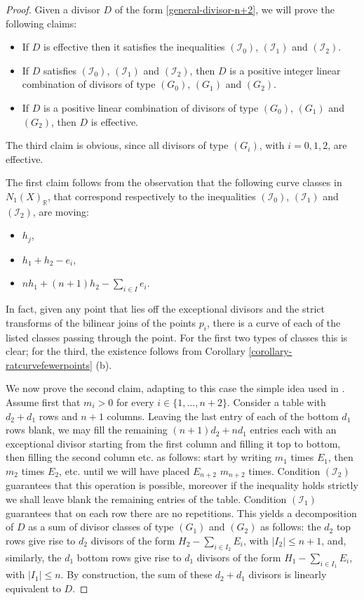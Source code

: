 \documentclass[a4paper,11pt]{article}
\begin{document}
\begin{proof}
Given a divisor $D$ of the form \eqref{general-divisor-n+2}, we will prove the following claims:
\begin{itemize}
\item If $D$ is effective then it satisfies the inequalities $(\mathcal I_0)$, $(\mathcal I_1)$ and $(\mathcal I_2)$.
\item If $D$ satisfies $(\mathcal{I}_0)$, $(\mathcal{I}_1)$ and $(\mathcal{I}_2)$, then $D$ is a positive integer linear combination of divisors of type $(G_0)$, $(G_1)$ and $(G_2)$.
\item If $D$ is a positive linear combination of divisors of type $(G_0)$, $(G_1)$ and $(G_2)$, then $D$ is effective.
\end{itemize}

The third claim is obvious, since all divisors of type $(G_i)$, with $i=0,1,2$, are effective.

The first claim follows from the observation that the following curve classes in $N_1(X)_\mathbb{R}$,  that correspond respectively  to the inequalities $(\mathcal{I}_0)$, $(\mathcal{I}_1)$ and $(\mathcal{I}_2)$, are moving:
\begin{itemize}
\item[($\mathcal{I}_0$)] $h_j$,
\item[($\mathcal{I}_1$)]  $h_1+h_2-e_i$,
\item[($\mathcal{I}_2$)]  $nh_1+(n+1)h_2 -\sum_{i\in I}e_i$.
\end{itemize}
In fact, given any point that lies off the exceptional divisors and the strict transforms of the bilinear joins of the points $p_i$, there is a curve of each of the listed classes passing through the point. For the first two types of classes this is clear; for the third, the existence follows from Corollary \ref{corollary-ratcurvefewerpoints} (b).

We now prove the second claim, adapting to this case the simple idea used in \cite[Lemma 4.24]{CT06}. Assume first that $m_i>0$ for every $i\in\{1,\dots,n+2\}$. Consider a table with $d_2+d_1$ rows and $n+1$ columns. Leaving the last entry of each of the bottom $d_1$ rows blank, we may fill  the remaining $(n+1)d_2+nd_1$ entries each with an exceptional divisor starting from the first column and filling it top to bottom, then filling the second column etc. as follows: start by writing $m_1$ times $E_1$, then $m_2$ times $E_2$, etc. until we will have placed $E_{n+2}$ $m_{n+2}$ times. Condition $(\mathcal{I}_2)$ guarantees that this operation is possible, moreover  if the inequality holds strictly we shall leave blank the remaining entries of the table. 
Condition $(\mathcal{I}_1)$ guarantees that on each row there are no repetitions. 
This yields a decomposition of $D$ as a sum of divisor classes of type  $(G_1)$ and $(G_2)$ as follows:  the $d_2$  top  rows give rise to $d_2$ divisors of the form $H_2-\sum_{i\in I_2}E_i$,  with $|I_2|\le n+1$, and, similarly,  the $d_1$ bottom rows give rise to $d_1$ divisors of the form $H_1-\sum_{i\in I_1}E_i$, with $|I_1|\le n$. By construction, the sum  of these $d_2+d_1$ divisors is linearly equivalent to $D$. 


\end{proof}
\end{document}

